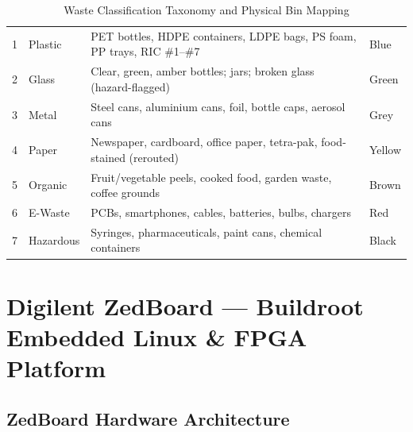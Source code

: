 \documentclass[12pt,a4paper]{article}
\begin{document}
\renewcommand{\arraystretch}{1.25}
\begin{table}[H]
\centering
\caption{Waste Classification Taxonomy and Physical Bin Mapping}
\label{tab:taxonomy}
\small
\begin{tabularx}{\linewidth}{@{} C{0.7cm} L{2.5cm} X L{2.2cm} @{}}
\toprule
\thead{\#} &  &  &  \\
\midrule
{}
1 & Plastic       & PET bottles, HDPE containers, LDPE bags, PS foam, PP trays, RIC \#1--\#7 & Blue \\
2 & Glass         & Clear, green, amber bottles; jars; broken glass (hazard-flagged) & Green \\
3 & Metal         & Steel cans, aluminium cans, foil, bottle caps, aerosol cans & Grey \\
4 & Paper         & Newspaper, cardboard, office paper, tetra-pak, food-stained (rerouted) & Yellow \\
5 & Organic       & Fruit/vegetable peels, cooked food, garden waste, coffee grounds & Brown \\
6 & E-Waste       & PCBs, smartphones, cables, batteries, bulbs, chargers & Red \\
7 & Hazardous     & Syringes, pharmaceuticals, paint cans, chemical containers & Black \\
\bottomrule
\end{tabularx}
\end{table}

\clearpage

\section{Digilent ZedBoard --- Buildroot Embedded Linux \& FPGA Platform}

\subsection{ZedBoard Hardware Architecture}
\end{document}
